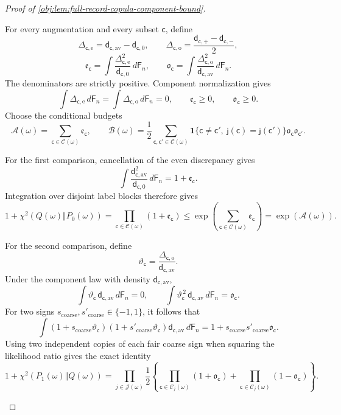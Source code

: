 \documentclass[11pt]{article}
\begin{document}
\begin{proof}[Proof of \cref{obj:lem:full-record-copula-component-bound}]
\begin{enumerate}
For every augmentation and every subset \(\mathsf c\), define
\[
\Delta_{\mathsf c,\mathrm e}
 =\mathsf d_{\mathsf c,\mathrm{av}}-\mathsf d_{\mathsf c,0},
\qquad
\Delta_{\mathsf c,\mathrm o}
 =\frac{\mathsf d_{\mathsf c,+}-\mathsf d_{\mathsf c,-}}2,
\]
\[
\mathfrak e_{\mathsf c}
 =\int\frac{\Delta_{\mathsf c,\mathrm e}^2}
                 {\mathsf d_{\mathsf c,0}}\,d\mathsf F_n,
\qquad
\mathfrak o_{\mathsf c}
 =\int\frac{\Delta_{\mathsf c,\mathrm o}^2}
                 {\mathsf d_{\mathsf c,\mathrm{av}}}\,d\mathsf F_n.
\]
The denominators are strictly positive. Component normalization gives
\[
\int\Delta_{\mathsf c,\mathrm e}\,d\mathsf F_n
 =\int\Delta_{\mathsf c,\mathrm o}\,d\mathsf F_n=0,
\qquad
\mathfrak e_{\mathsf c}\ge0,\qquad
\mathfrak o_{\mathsf c}\ge0.
\]
Choose the conditional budgets
\[
\mathcal A(\omega)
 =\sum_{\mathsf c\in\mathscr C(\omega)}
       \mathfrak e_{\mathsf c},
\qquad
\mathcal B(\omega)
 =\frac12
   \sum_{\mathsf c,\mathsf c'\in\mathscr C(\omega)}
   \mathbf1\{\mathsf c\ne\mathsf c',\
             \mathsf j(\mathsf c)=\mathsf j(\mathsf c')\}
       \mathfrak o_{\mathsf c}\mathfrak o_{\mathsf c'}.
\]

For the first comparison, cancellation of the even discrepancy gives
\[
\int
 \frac{\mathsf d_{\mathsf c,\mathrm{av}}^2}
      {\mathsf d_{\mathsf c,0}}\,d\mathsf F_n
 =1+\mathfrak e_{\mathsf c}.
\]
Integration over disjoint label blocks therefore gives
\[
1+\chi^2(Q(\omega)\Vert P_0(\omega))
 =\prod_{\mathsf c\in\mathscr C(\omega)}
      (1+\mathfrak e_{\mathsf c})
 \le\exp\!\left(
       \sum_{\mathsf c\in\mathscr C(\omega)}
          \mathfrak e_{\mathsf c}\right)
 =\exp(\mathcal A(\omega)).
\]

For the second comparison, define
\[
\vartheta_{\mathsf c}
 =\frac{\Delta_{\mathsf c,\mathrm o}}
        {\mathsf d_{\mathsf c,\mathrm{av}}}.
\]
Under the component law with density
\(\mathsf d_{\mathsf c,\mathrm{av}}\),
\[
\int\vartheta_{\mathsf c}\,
       \mathsf d_{\mathsf c,\mathrm{av}}\,d\mathsf F_n=0,
\qquad
\int\vartheta_{\mathsf c}^{\,2}\,
       \mathsf d_{\mathsf c,\mathrm{av}}\,d\mathsf F_n
 =\mathfrak o_{\mathsf c}.
\]
For two signs \(s_{\mathrm{coarse}},s'_{\mathrm{coarse}}\in\{-1,1\}\), it follows that
\[
\int
 (1+s_{\mathrm{coarse}}\vartheta_{\mathsf c})
 (1+s'_{\mathrm{coarse}}\vartheta_{\mathsf c})
 \mathsf d_{\mathsf c,\mathrm{av}}\,d\mathsf F_n
 =
 1+s_{\mathrm{coarse}}s'_{\mathrm{coarse}}
       \mathfrak o_{\mathsf c}.
\]
Using two independent copies of each fair coarse sign when squaring the likelihood ratio gives the exact identity
\[
1+\chi^2(P_1(\omega)\Vert Q(\omega))
 =
 \prod_{j\in\mathscr J(\omega)}
 \frac12\left\{
 \prod_{\mathsf c\in\mathscr C_j(\omega)}
      (1+\mathfrak o_{\mathsf c})
 +
 \prod_{\mathsf c\in\mathscr C_j(\omega)}
      (1-\mathfrak o_{\mathsf c})
 \right\}.
\]


\end{enumerate}
\end{proof}
\end{document}
